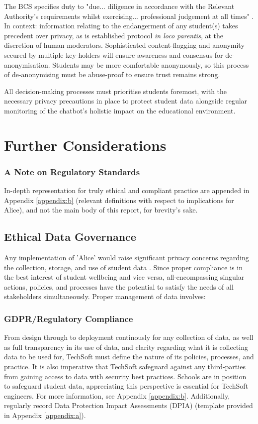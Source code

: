 \documentclass[14pt,a4paper]{article}
\begin{document}
\begin{multicols}{2}
The BCS specifies duty to "due... diligence in accordance with the Relevant Authority's requirements whilst exercising... professional judgement at all times" \textit{\parencite[p. 2]{BCS2024}}.
In context: information relating to the endangerment of any student(s) takes precedent over privacy, as is established protocol \textit{in loco parentis}, at the discretion of human moderators.
Sophisticated content-flagging and anonymity secured by multiple key-holders will ensure awareness and consensus for de-anonymisation.
Students may be more comfortable anonymously, so this process of de-anonymising must be abuse-proof to ensure trust remains strong.

All decision-making processes must prioritise students foremost, with the necessary privacy precautions in place to protect student data alongside regular monitoring of the chatbot's holistic impact on the educational environment.

\section{Further Considerations}

\subsubsection*{A Note on Regulatory Standards}
In-depth representation for truly ethical and compliant practice are appended in Appendix \ref{appendix:b} (relevant definitions with respect to implications for Alice), and not the main body of this report, for brevity's sake.

\subsection{Ethical Data Governance}
Any implementation of 'Alice' would raise significant privacy concerns regarding the collection, storage, and use of student data \textit{\parencite[pp. 366-370]{Annus2023}}.
Since proper compliance is in the best interest of student wellbeing and vice versa, all-encompassing singular actions, policies, and processes have the potential to satisfy the needs of all stakeholders simultaneously. Proper management of data involves:

\subsubsection{GDPR/Regulatory Compliance}
From design through to deployment continously for any collection of data, as well as full transparency in its use of data, and clarity regarding what it is collecting data to be used for, TechSoft must define the nature of its policies, processes, and practice. It is also imperative that TechSoft safeguard against any third-parties from gaining access to data with security best practices. Schools are in position to safeguard student data, appreciating this perspective is essential for TechSoft engineers. For more information, see Appendix \ref{appendix:b}. Additionally, regularly record Data Protection Impact Assessments (DPIA) (template provided in Appendix \ref{appendix:a}).


\end{multicols}
\end{document}
